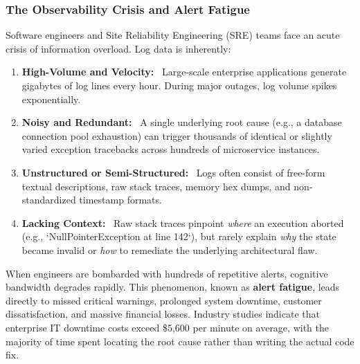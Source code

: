 \documentclass[12pt,a4paper]{article}
\newcommand{\lead}[1]{\textbf{#1}\ }
\begin{document}
\subsubsection{The Observability Crisis and Alert Fatigue}
Software engineers and Site Reliability Engineering (SRE) teams face an acute crisis of information overload. Log data is inherently:
\begin{enumerate}[leftmargin=1.5em]
    \item \lead{High-Volume and Velocity:} Large-scale enterprise applications generate gigabytes of log lines every hour. During major outages, log volume spikes exponentially.
    \item \lead{Noisy and Redundant:} A single underlying root cause (e.g., a database connection pool exhaustion) can trigger thousands of identical or slightly varied exception tracebacks across hundreds of microservice instances.
    \item \lead{Unstructured or Semi-Structured:} Logs often consist of free-form textual descriptions, raw stack traces, memory hex dumps, and non-standardized timestamp formats.
    \item \lead{Lacking Context:} Raw stack traces pinpoint \textit{where} an execution aborted (e.g., `NullPointerException at line 142`), but rarely explain \textit{why} the state became invalid or \textit{how} to remediate the underlying architectural flaw.
\end{enumerate}

When engineers are bombarded with hundreds of repetitive alerts, cognitive bandwidth degrades rapidly. This phenomenon, known as \textbf{alert fatigue}, leads directly to missed critical warnings, prolonged system downtime, customer dissatisfaction, and massive financial losses. Industry studies indicate that enterprise IT downtime costs exceed \$5,600 per minute on average, with the majority of time spent locating the root cause rather than writing the actual code fix.
\end{document}
